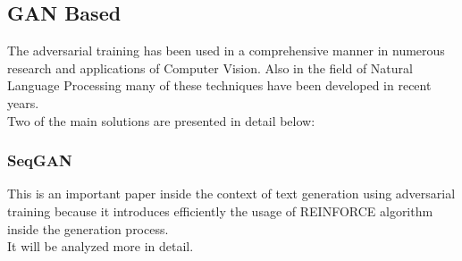 \subsection{GAN Based}
The adversarial training has been used in a comprehensive manner in numerous research and applications of Computer Vision. Also in the field of Natural Language Processing many of these techniques have been developed in recent years. \\
Two of the main solutions are presented in detail below:
\subsubsection[SeqGAN]{SeqGAN \cite{Yu2016}}
This is an important paper inside the context of text generation using adversarial training because it introduces efficiently the usage of REINFORCE algorithm inside the generation process. \\
It will be analyzed more in detail.


